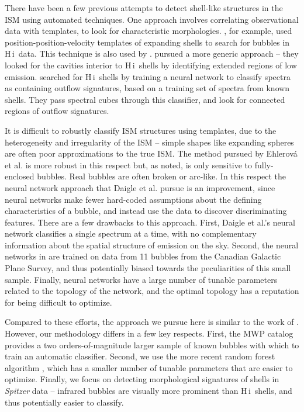\documentclass[preprint]{aastex}
\newcommand{\hi}[0]{{\sc H\,i}}
\begin{document}
There have been a few previous attempts to detect shell-like structures in the ISM using automated techniques. One approach involves correlating observational data with templates, to look for characteristic morphologies. \cite{Thilker98}, for example, used position-position-velocity templates of expanding shells to search for bubbles in \hi\, data. This technique is also used by \cite{Mashchenko95, Mashchenko02}. \cite{Ehlerova05, Ehlerova13} pursued a more generic approach -- they looked for the cavities interior to \hi\, shells by identifying extended regions of low emission. \cite{Daigle03, Daigle07} searched for \hi\, shells by training a neural network to classify spectra as containing outflow signatures, based on a training set of spectra from known shells. They pass spectral cubes through this classifier, and look for connected regions of outflow signatures. 

It is difficult to robustly classify ISM structures using templates, due to the heterogeneity and irregularity of the ISM -- simple shapes like expanding spheres are often poor approximations to the true ISM. The method pursued by Ehlerov{\'a} et al. is more robust in this respect but, as \cite{Daigle07} noted, is only sensitive to fully-enclosed bubbles. Real bubbles are often broken or arc-like. In this respect the neural network approach that Daigle et al. pursue is an improvement, since neural networks make fewer hard-coded assumptions about the defining characteristics of a bubble, and instead use the data to discover discriminating features. There are a few drawbacks to this approach. First, Daigle et al.'s neural network classifies a single spectrum at a time, with no complementary information about the spatial structure of emission on the sky. Second, the neural networks in \cite{Daigle07} are trained on data from 11 bubbles from the Canadian Galactic Plane Survey, and thus potentially biased towards the peculiarities of this small sample. Finally, neural networks have a large number of tunable parameters related to the topology of the network, and the optimal topology has a reputation for being difficult to optimize. 

Compared to these efforts, the approach we pursue here is similar to the work of \cite{Daigle07}. However, our methodology differs in a few key respects. First, the MWP catalog provides a two orders-of-magnitude larger sample of known bubbles with which to train an automatic classifier. Second, we use the more recent random forest algorithm \citep{Breiman01}, which has a smaller number of tunable parameters that are easier to optimize. Finally, we focus on detecting morphological signatures of shells in \emph{Spitzer} data -- infrared bubbles are visually more prominent than \hi\, shells, and thus potentially easier to classify.
\end{document}
